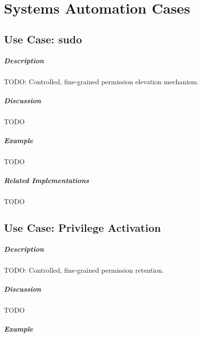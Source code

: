 \chapter{Systems Automation Cases}

\section{Use Case: \textsf{sudo}}

\paragraph{Description}

{\Large TODO:} Controlled, fine-grained permission elevation mechanism.

\paragraph{Discussion}

{\Large TODO}

\paragraph{Example}

{\Large TODO}

\paragraph{Related Implementations}

{\Large TODO}

\section{Use Case: Privilege Activation}

\paragraph{Description}

{\Large TODO:} Controlled, fine-grained permission retention.

\paragraph{Discussion}

{\Large TODO}

\paragraph{Example}

